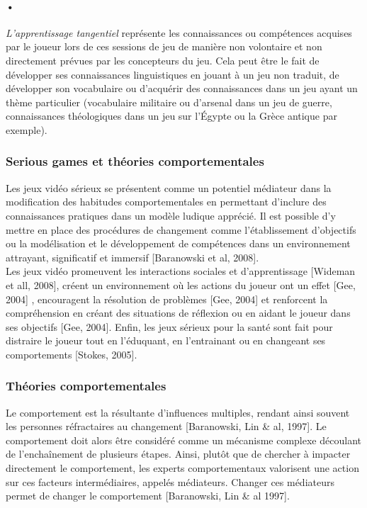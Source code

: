 \paragraph{•}\emph{L'apprentissage tangentiel} représente les connaissances ou compétences acquises par le joueur lors de ces sessions de jeu de manière non volontaire et non directement prévues par les concepteurs du jeu. Cela peut être le fait de développer ses connaissances linguistiques en jouant à un jeu non traduit, de développer son vocabulaire ou d'acquérir des connaissances dans un jeu ayant un thème particulier (vocabulaire militaire ou d'arsenal dans un jeu de guerre, connaissances théologiques dans un jeu sur l'Égypte ou la Grèce antique par exemple).

		\subsubsection{Serious games et théories comportementales}
Les jeux vidéo sérieux se présentent comme un potentiel médiateur dans la modification des habitudes comportementales en permettant d’inclure des connaissances pratiques dans un modèle ludique apprécié. Il est possible d’y mettre en place des procédures de changement comme l’établissement d’objectifs ou la modélisation et le développement de compétences dans un environnement attrayant, significatif et immersif [Baranowski et al, 2008]\cite{Bara08}. \\
Les jeux vidéo promeuvent les interactions sociales et d’apprentissage [Wideman et all, 2008], créent un environnement où les actions du joueur ont un effet [Gee, 2004]\cite{Gee04} , encouragent la résolution de problèmes [Gee, 2004]\cite{Gee04} et renforcent la compréhension en créant des situations de réflexion ou en aidant le joueur dans ses objectifs [Gee, 2004]\cite{Gee04}. Enfin, les jeux sérieux pour la santé sont fait pour distraire le joueur tout en l’éduquant, en l’entrainant ou en changeant ses comportements [Stokes, 2005]\cite{Stok05}.

		\subsubsection*{Théories comportementales}
Le comportement est la résultante d’influences multiples, rendant ainsi souvent les personnes réfractaires au changement [Baranowski, Lin \& al, 1997]\cite{Bara97}. Le comportement doit alors être considéré comme un mécanisme complexe découlant de l’enchaînement de plusieurs étapes. Ainsi, plutôt que de chercher à impacter directement le comportement, les experts comportementaux valorisent une action sur ces facteurs intermédiaires, appelés médiateurs. Changer ces médiateurs permet de changer le comportement [Baranowski, Lin \& al 1997]\cite{Bara97}.
